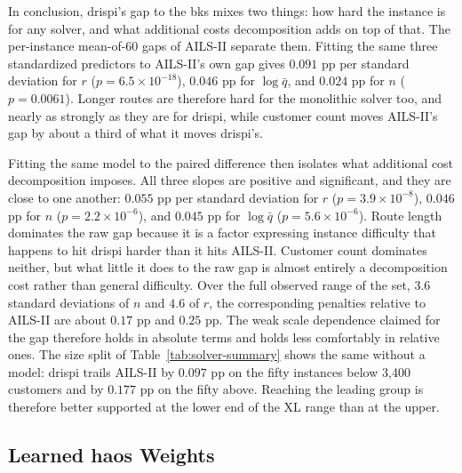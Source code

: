 In conclusion, \gls{drispi}'s gap to the \gls{bks} mixes two things: how hard the instance is for any solver, and
what additional costs decomposition adds on top of that. The per-instance mean-of-60 gaps of
AILS-II separate them. Fitting the same three standardized predictors to
AILS-II's own gap gives $0.091$ pp per standard deviation for $r$
($p = 6.5 \times 10^{-18}$), $0.046$ pp for $\log \bar{q}$, and $0.024$ pp for
$n$ ($p = 0.0061$). Longer routes are therefore hard for the monolithic solver
too, and nearly as strongly as they are for \gls{drispi}, while customer count moves
AILS-II's gap by about a third of what it moves \gls{drispi}'s.

Fitting the same model to the paired difference then isolates what additional cost decomposition imposes. All three slopes are positive and significant, and they are close to
one another: $0.055$ pp per standard deviation for $r$
($p = 3.9 \times 10^{-8}$), $0.046$ pp for $n$ ($p = 2.2 \times 10^{-6}$), and
$0.045$ pp for $\log \bar{q}$ ($p = 5.6 \times 10^{-6}$). Route length
dominates the raw gap because it is a factor expressing instance difficulty that happens to
hit \gls{drispi} harder than it hits AILS-II. Customer count dominates
neither, but what little it does to the raw gap is almost entirely a
decomposition cost rather than general difficulty. Over the full observed range
of the set, $3.6$ standard deviations of $n$ and $4.6$ of $r$, the
corresponding penalties relative to AILS-II are about $0.17$ pp and $0.25$ pp.
The weak scale dependence claimed for the gap therefore holds in absolute
terms and holds less comfortably in relative ones. The size split of Table~\ref{tab:solver-summary} shows the same without a model: \gls{drispi} trails AILS-II by $0.097$ pp on the fifty instances below 3,400
customers and by $0.177$ pp on the fifty above. Reaching the leading group is
therefore better supported at the lower end of the XL range than at the upper.

\subsection[Learned HAOS Weights]{\texorpdfstring{Learned \gls{haos} Weights}{Learned HAOS Weights}}
\label{sec:stu-haos}

